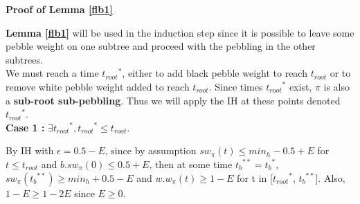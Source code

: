 \documentclass[12pt]{article}
\newenvironment{proofL}{\hspace{.4em}}
                      {\hspace{\fill}{$\blacksquare$} \smallskip}
\newcommand{\troot}{t_{root}}
\newcommand{\troots}{{t_{root}}^*}
\newcommand{\tbss}{{t_b}^{**}}
\newcommand{\tbs}{{t_b}^{*}}
\begin{document}
\noindent
 {\bf Proof of Lemma \ref{flb1}}\begin{proofL} 

 {\bf Lemma \ref{flb1}} will be used in the induction step since it is possible to leave some pebble weight on one subtree and proceed with the pebbling in the other subtrees.\\





We must reach a time $\troots$, either to add black pebble weight to reach $\troot$ or to remove white pebble weight added to reach $\troot$. Since times $\troots$ exist, $\pi$ is also a {\bf sub-root sub-pebbling}. Thus we will apply the IH at these points denoted $\troots$.\\

\noindent
{\bf Case 1 :} $\exists \troots, \troots \leq \troot$. 

By IH with $\epsilon=0.5-E$, since by assumption $sw_\pi(t) \leq min_h-0.5+E$ for $t \leq \troot$ and $b.sw_{\pi}(0) \leq 0.5+E$, then at some time $\tbss=\tbs$, $sw_\pi(\tbss ) \geq min_h+0.5-E$ and $w.w_\pi(t) \geq  1-E$ for t in [$\troots$, $\tbss$]. Also, $1-E \geq 1-2E$ since $E \geq 0$. 


\end{proofL}
\end{document}
